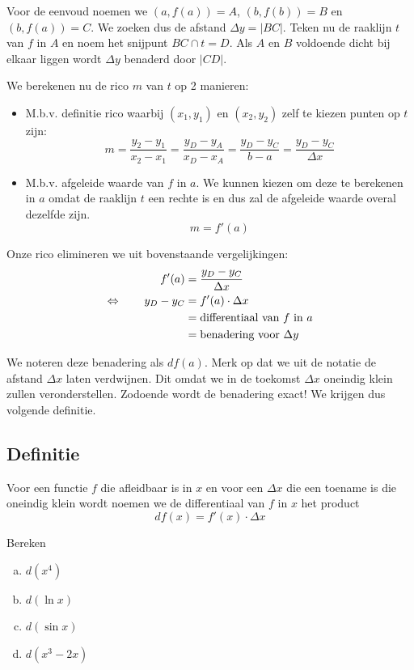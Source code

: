 \documentclass[a4paper,12pt, twoside]{article}
\begin{document}
Voor de eenvoud noemen we $(a,f(a))=A$, $(b,f(b))=B$ en $(b,f(a))=C$. We zoeken dus de afstand $\Delta y=|BC|$. Teken nu de raaklijn $t$ van $f$ in $A$ en noem het snijpunt $BC \cap t=D$. Als $A$ en $B$ voldoende dicht bij elkaar liggen wordt $\Delta y$ benaderd door $|CD|$.

We berekenen nu de rico $m$ van $t$ op 2 manieren:
\begin{itemize}
\item M.b.v. definitie rico waarbij $(x_1,y_1)$ en $(x_2, y_2)$ zelf te kiezen punten op $t$ zijn:
  $$m=\dfrac{y_2-y_1}{x_2-x_1}=\dfrac{y_D-y_A}{x_D-x_A}=\dfrac{y_D-y_C}{b-a}=\dfrac{y_D-y_C}{\Delta x}$$
\item M.b.v. afgeleide waarde van $f$ in $a$. We kunnen kiezen om deze te berekenen in $a$ omdat de raaklijn $t$ een rechte is en dus zal de afgeleide waarde overal dezelfde zijn.
  $$m = f'(a)$$
\end{itemize}

Onze rico elimineren we uit bovenstaande vergelijkingen:
\begin{align*}
     f'(a)       & = \dfrac{y_D-y_C}{\Delta x}                \\
\Leftrightarrow \qquad y_D - y_C & = f'(a)\cdot \Delta x                          \\
                 & = \mbox{differentiaal van $f$ in $a$} \\
                 & = \mbox{benadering voor $\Delta y$}        \\
\end{align*}

We noteren deze benadering als $df(a)$. Merk op dat we uit de notatie de afstand $\Delta x$ laten verdwijnen. Dit omdat we in de toekomst $\Delta x$ oneindig klein zullen veronderstellen. Zodoende wordt de benadering exact! We krijgen dus volgende definitie.

\subsection{Definitie}
Voor een functie $f$ die afleidbaar is in $x$ en voor een $\Delta x$ die een toename is die oneindig klein wordt noemen we de differentiaal van $f$ in $x$ het product
$$df(x)=f'(x)\cdot\Delta x$$

\begin{oefening}
Bereken
\begin{multicols}{2}
\begin{enumerate}[(a)]
  \itemsep1em
  \item $\displaystyle d(x^4)$
  \item $\displaystyle d(\ln x)$
  \item $\displaystyle d(\sin x)$
  \item $\displaystyle d(x^3-2x)$
\end{enumerate}
\end{multicols}
\end{oefening}
\end{document}
